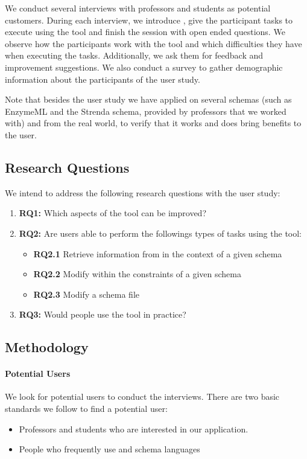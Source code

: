 We conduct several interviews with professors and students as potential customers.
During each interview, we introduce \toolname{}, give the participant tasks to execute using the tool and finish the session with open ended questions.
We observe how the participants work with the tool and which difficulties they have when executing the tasks.
Additionally, we ask them for feedback and improvement suggestions.
We also conduct a survey to gather demographic information about the participants of the user study.

Note that besides the user study we have applied \toolname{} on several schemas (such as EnzymeML\cite{TODO} and the Strenda schema\cite{TODO}, provided by professors that we worked with) and \cfgfiles{} from the real world, to verify that it works and does bring benefits to the user.

\subsection{Research Questions}\label{subsec:research_questions}
We intend to address the following research questions with the user study:
\begin{enumerate}
	\item \textbf{RQ1:} Which aspects of the tool can be improved?
	\item \textbf{RQ2:} Are users able to perform the followings types of tasks using the tool:
	 \begin{itemize}
			\item \textbf{RQ2.1} Retrieve information from \cfgfiles{} in the context of a given schema
			\item \textbf{RQ2.2} Modify \cfgfiles{} within the constraints of a given schema
			\item \textbf{RQ2.3} Modify a schema file
		\end{itemize}
	\item \textbf{RQ3:} Would people use the tool in practice?
\end{enumerate}

\subsection{Methodology}\label{subsec:methodology} %

\paragraph{Potential Users}
We look for potential users to conduct the interviews.
There are two basic standards we follow to find a potential user:
\begin{itemize}
    \item Professors and students who are interested in our application.
    \item People who frequently use \cfgfiles and schema languages
\end{itemize}

